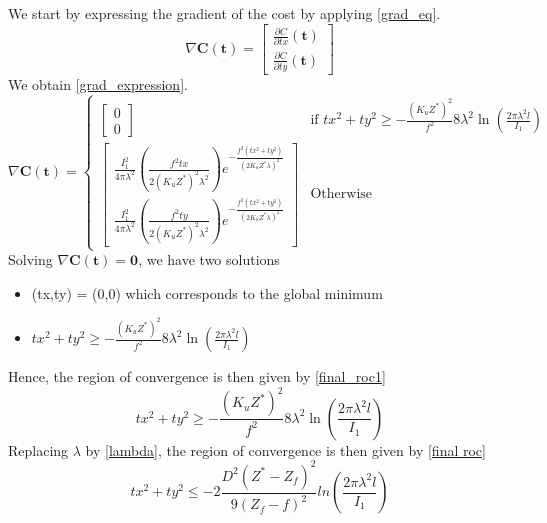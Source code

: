  \par We start by expressing the gradient of the cost by applying \eqref{grad_eq}.
 \begin{equation}
    \nabla \textbf{C}(\textbf{t}) = \begin{bmatrix}
        \frac{\partial C}{\partial tx}(\textbf{t})\\
        \frac{\partial C}{\partial ty}(\textbf{t})
    \end{bmatrix}
    \label{grad_eq}
 \end{equation}
 We obtain \eqref{grad_expression}.
 \begin{equation}
    \nabla \textbf{C}(\textbf{t}) = 
    \begin{cases}
        \begin{bmatrix}
            0 \\ 0 
        \end{bmatrix} & \text{if  } tx^{2}+ty^{2} \geq -\frac{(K_{u}Z^{*})^{2}}{f^{2}}8\lambda^2\ln\left(\frac{2\pi\lambda^{2}l}{I_{1}}\right)\\
        \begin{bmatrix}
            \frac{I_{1}^{2}}{4\pi\lambda^{2}}\left(\frac{f^{2}tx}{2(K_{u}Z^{*})^{2}\lambda^{2}}\right)e^{-\frac{f^{2}\left(tx^{2}+ty^{2}\right)}{(2K_{u}Z^{*}\lambda)^{2}}}\\ \frac{I_{1}^{2}}{4\pi\lambda^{2}}\left(\frac{f^{2}ty}{2(K_{u}Z^{*})^{2}\lambda^{2}}\right)e^{-\frac{f^{2}\left(tx^{2}+ty^{2}\right)}{(2K_{u}Z^{*}\lambda)^{2}}} 
        \end{bmatrix} & \text{Otherwise}
    \end{cases} 
    \label{grad_expression}
 \end{equation}
Solving $\nabla \textbf{C}(\textbf{t})= \textbf{0}$, we have two solutions
\begin{itemize}
    \item (tx,ty) = (0,0) which corresponds to the global minimum
    \item $tx^{2}+ty^{2} \geq -\frac{(K_{u}Z^{*})^{2}}{f^{2}}8\lambda^2\ln\left(\frac{2\pi\lambda^{2}l}{I_{1}}\right)$
\end{itemize}
Hence, the region of convergence is then given by \eqref{final_roc1}
\begin{equation}
    \boxed{
        tx^{2}+ty^{2} \geq -\frac{(K_{u}Z^{*})^{2}}{f^{2}}8\lambda^2\ln\left(\frac{2\pi\lambda^{2}l}{I_{1}}\right)
    }
    \label{final_roc1}
\end{equation}
Replacing $\lambda $ by  \eqref{lambda}, the region of convergence is then given by \eqref{final roc}
\begin{equation}
    \boxed{
        tx^{2}+ty^{2} \leq -2\frac{D^{2}(Z^{*}-Z_{f})^{2}}{9(Z_{f}-f)^{2}}ln\left(\frac{2\pi\lambda^{2}l}{I_{1}}\right)
    }
    \label{final roc}
\end{equation}